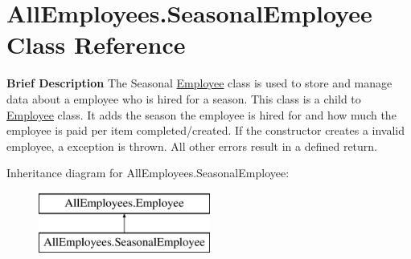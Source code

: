 \hypertarget{class_all_employees_1_1_seasonal_employee}{}\section{All\+Employees.\+Seasonal\+Employee Class Reference}
\label{class_all_employees_1_1_seasonal_employee}


{\bfseries Brief Description} The Seasonal \hyperlink{class_all_employees_1_1_employee}{Employee} class is used to store and manage data about a employee who is hired for a season. This class is a child to \hyperlink{class_all_employees_1_1_employee}{Employee} class. It adds the season the employee is hired for and how much the employee is paid per item completed/created. If the constructor creates a invalid employee, a exception is thrown. All other errors result in a defined return.  


Inheritance diagram for All\+Employees.\+Seasonal\+Employee\+:\begin{figure}[H]
\begin{center}
\leavevmode
\includegraphics[height=2.000000cm]{class_all_employees_1_1_seasonal_employee}
\end{center}
\end{figure}
